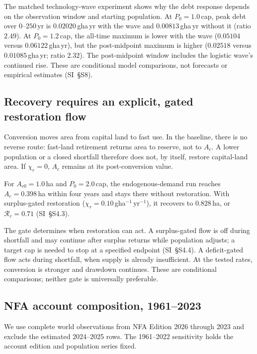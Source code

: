 \documentclass[preprint,12pt,authoryear]{elsarticle}
\begin{document}
The matched technology-wave experiment shows why the debt response depends on the observation window and starting population. At $P_0=1.0$\,cap, peak debt over $0$--$250$\,yr is $0.02020$\,gha\,yr with the wave and $0.00813$\,gha\,yr without it (ratio $2.49$). At $P_0=1.2$\,cap, the all-time maximum is lower with the wave ($0.05104$ versus $0.06122$\,gha\,yr), but the post-midpoint maximum is higher ($0.02518$ versus $0.01085$\,gha\,yr; ratio $2.32$). The post-midpoint window includes the logistic wave's continued rise. These are conditional model comparisons, not forecasts or empirical estimates (SI~\S S8).

\subsection{Recovery requires an explicit, gated restoration flow}\label{sec:recovery}

Conversion moves area from capital land to fast use. In the baseline, there is no reverse route: fast-land retirement returns area to reserve, not to $A_c$. A lower population or a closed shortfall therefore does not, by itself, restore capital-land area. If $\chi_r=0$, $A_c$ remains at its post-conversion value.

For $A_{c0}=1.0$\,ha and $P_0=2.0$\,cap, the endogenous-demand run reaches $A_c=0.398$\,ha within four years and stays there without restoration. With surplus-gated restoration ($\chi_r=0.10$\,gha$^{-1}$\,yr$^{-1}$), it recovers to $0.828$\,ha, or $\mathcal R_c=0.71$ (SI~\S S4.3).

The gate determines when restoration can act. A surplus-gated flow is off during shortfall and may continue after surplus returns while population adjusts; a target cap is needed to stop at a specified endpoint (SI~\S S4.4). A deficit-gated flow acts during shortfall, when supply is already insufficient. At the tested rates, conversion is stronger and drawdown continues. These are conditional comparisons; neither gate is universally preferable.

\subsection{NFA account composition, 1961--2023}

\label{sec:empirical}

We use complete world observations from NFA Edition 2026 through 2023 and exclude the estimated 2024--2025 rows. The 1961--2022 sensitivity holds the account edition and population series fixed.
\end{document}
